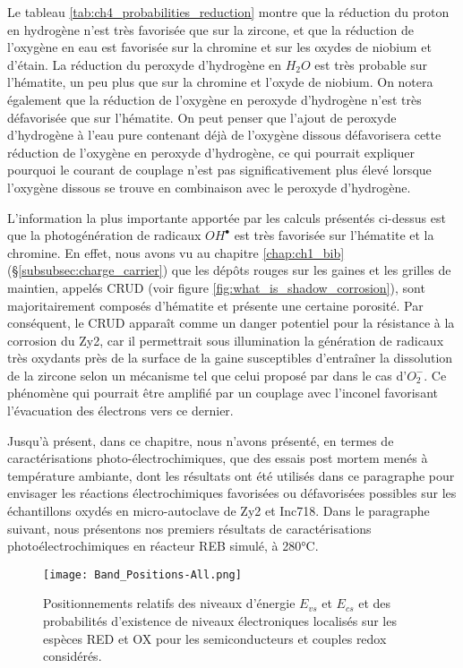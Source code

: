 \begin{refsection}
    Le tableau \ref{tab:ch4_probabilities_reduction}  montre que la réduction du proton en hydrogène n’est très favorisée
    que sur la zircone, et que la
    réduction de l’oxygène en eau est favorisée sur la chromine et sur les oxydes de niobium et d’étain. La réduction du
    peroxyde d’hydrogène en $H_2O$ est très probable sur l’hématite, un peu plus que sur la chromine et l’oxyde de niobium. On
    notera également que la réduction de l’oxygène en peroxyde d’hydrogène n’est très défavorisée que sur l’hématite. On
    peut penser que l’ajout de peroxyde d’hydrogène à l’eau pure contenant déjà de l’oxygène dissous défavorisera cette
    réduction de l’oxygène en peroxyde d’hydrogène, ce qui pourrait expliquer pourquoi le courant de couplage n’est pas
    significativement plus élevé lorsque l’oxygène dissous se trouve en combinaison avec le peroxyde d’hydrogène.

    L’information la plus importante apportée par les calculs présentés ci-dessus est que la photogénération de radicaux
    $OH^{\bullet}$
    est très favorisée sur l’hématite et la chromine. En effet, nous avons vu au chapitre \ref{chap:ch1_bib} (\S \ref{subsubsec:charge_carrier})
    que les dépôts rouges sur
    les gaines et les grilles de maintien, appelés CRUD (voir figure \ref{fig:what_is_shadow_corrosion}), sont majoritairement composés d’hématite et
    présente une certaine porosité. Par conséquent, le CRUD apparaît comme un danger potentiel pour la  résistance à la
    corrosion du Zy2, car il permettrait sous illumination la génération de radicaux très oxydants près de la surface de la
    gaine susceptibles d’entraîner la dissolution de la zircone selon un mécanisme tel que celui proposé par  \citet{Nishino1997} dans le cas
    d’$O_2^{-}$.
    Ce phénomène qui pourrait être amplifié par un couplage avec l’inconel favorisant l’évacuation
    des électrons vers ce dernier.

    Jusqu’à présent, dans ce chapitre, nous n’avons présenté, en termes de caractérisations photo-électrochimiques, que des
    essais post mortem menés à température ambiante, dont les résultats ont été utilisés dans ce paragraphe pour envisager
    les réactions électrochimiques favorisées ou défavorisées possibles sur les échantillons oxydés en micro-autoclave de
    Zy2 et Inc718. Dans le paragraphe suivant, nous présentons nos premiers résultats de caractérisations
    photoélectrochimiques en réacteur REB simulé, à 280°C.

     \begin{figure}[H]
        \centering
        \texttt{[image: Band\_Positions-All.png]}
        \caption{Positionnements relatifs des niveaux d’énergie $E_{vs}$ et $E_{cs}$  et des probabilités d’existence de niveaux
        électroniques localisés sur les espèces RED et OX pour les semiconducteurs et couples redox considérés.}
        \label{fig:ch4_pos_RED_OX}
    \end{figure}


\end{refsection}

